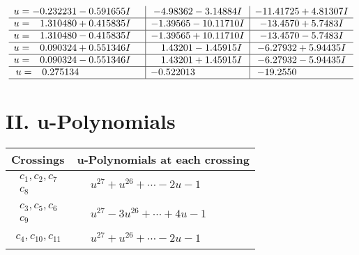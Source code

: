 \documentclass[1p]{elsarticle_modified}
\theoremstyle{definition}
\begin{document}
$$\begin{array}{c|c|c}
\begin{aligned}
u &= -0.232231 - 0.591655 I\end{aligned}
 & -4.98362 - 3.14884 I & -11.41725 + 4.81307 I \\ \hline\begin{aligned}
u &= \phantom{-}1.310480 + 0.415835 I\end{aligned}
 & -1.39565 - 10.11710 I & -13.4570 + 5.7483 I \\ \hline\begin{aligned}
u &= \phantom{-}1.310480 - 0.415835 I\end{aligned}
 & -1.39565 + 10.11710 I & -13.4570 - 5.7483 I \\ \hline\begin{aligned}
u &= \phantom{-}0.090324 + 0.551346 I\end{aligned}
 & \phantom{-}1.43201 - 1.45915 I & -6.27932 + 5.94435 I \\ \hline\begin{aligned}
u &= \phantom{-}0.090324 - 0.551346 I\end{aligned}
 & \phantom{-}1.43201 + 1.45915 I & -6.27932 - 5.94435 I \\ \hline\begin{aligned}
u &= \phantom{-}0.275134\phantom{ +0.000000I}\end{aligned}
 & -0.522013\phantom{ +0.000000I} & -19.2550\phantom{ +0.000000I}\\
 \hline 
 \end{array}$$\newpage
\newpage\renewcommand{\arraystretch}{1}
\centering \section*{ II. u-Polynomials}
\begin{tabular}{m{50pt}|m{274pt}}
Crossings & \hspace{64pt}u-Polynomials at each crossing \\
\hline $$\begin{aligned}c_{1},c_{2},c_{7}\\c_{8}\end{aligned}$$&$\begin{aligned}
&u^{27}+u^{26}+\cdots-2 u-1
\end{aligned}$\\
\hline $$\begin{aligned}c_{3},c_{5},c_{6}\\c_{9}\end{aligned}$$&$\begin{aligned}
&u^{27}-3 u^{26}+\cdots+4 u-1
\end{aligned}$\\
\hline $$\begin{aligned}c_{4},c_{10},c_{11}\end{aligned}$$&$\begin{aligned}
&u^{27}+u^{26}+\cdots-2 u-1
\end{aligned}$\\
\hline
\end{tabular}\newpage\renewcommand{\arraystretch}{1}
\end{document}
